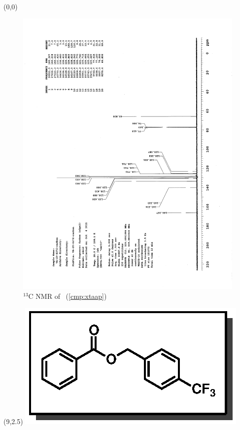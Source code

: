 \clearpage
\begin{textblock}{20}(0,0)
\begin{figure}[htb]
\caption{$^{13}$C NMR of  \CMPxtaap\ (\ref{cmp:xtaap})}
\includegraphics[scale=0.75, trim = 0mm 0mm 0mm 5mm,
clip]{chp_asymmetric/images/nmr/xtaapC}
\vspace{-100pt}
\end{figure}
\end{textblock}
\begin{textblock}{1}(9,2.5)
\includegraphics[scale=0.8, angle=90]{chp_asymmetric/images/xtaap}
\end{textblock}
\clearpage

